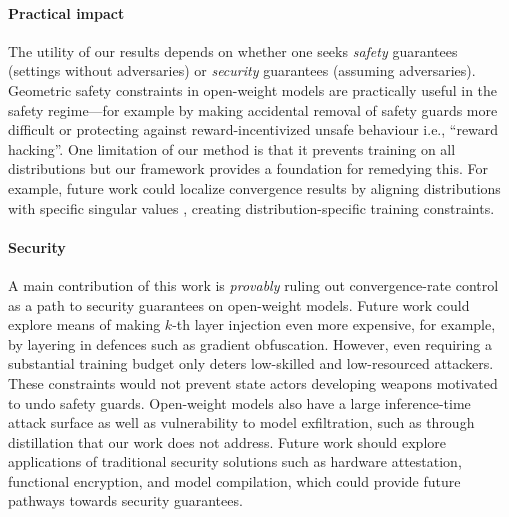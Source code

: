 \documentclass{article}
\theoremstyle{plain}
\theoremstyle{definition}
\theoremstyle{remark}
\begin{document}
\paragraph{Practical impact} The utility of our results depends on whether one seeks \textit{safety} guarantees (settings without adversaries) or \textit{security} guarantees (assuming adversaries). Geometric safety constraints in open-weight models are practically useful in the safety regime---for example by making accidental removal of safety guards more difficult \citep{qi2023fine} or protecting against reward-incentivized unsafe behaviour \citep{dai2024safe} i.e., ``reward hacking''. One limitation of our method is that it prevents training on all distributions but our framework provides a foundation for remedying this. For example, future work could localize convergence results by aligning distributions with specific singular values \citep{zheng2025model}, creating distribution-specific training constraints.

\paragraph{Security} A main contribution of this work is \textit{provably} ruling out convergence-rate control as a path to security guarantees on open-weight models. Future work could explore means of making $k$-th layer injection even more expensive, for example, by layering in defences such as gradient obfuscation. However, even requiring a substantial training budget only deters low-skilled and low-resourced attackers. These constraints would not prevent state actors developing weapons motivated to undo safety guards. Open-weight models also have a large inference-time attack surface \citep{rando2025adversarial} as well as vulnerability to model exfiltration, such as through distillation \citep{dionicio2025undistillable} that our work does not address. Future work should explore applications of traditional security solutions such as hardware attestation, functional encryption, and model compilation, which could provide future pathways towards security guarantees.

\end{document}
